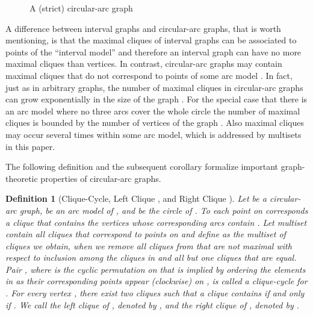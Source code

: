 \documentclass[10pt]{article}
\newtheorem{definition}[theorem]{Definition}
\newcommand{\q}[1]{``#1''}\newcommand{\fu}[1]{\mathcal{#1}}\newcommand{\mc}[1]{\mathsf{#1}}\newcommand{\ri}[1]{\mathscr{#1}}\newcommand{\co}[1]{\fu{C}({#1})}\newcommand{\lc}[1]{\alpha(#1)}\newcommand{\rc}[1]{\beta(#1)}\newcommand{\ema}[1]{\mathcal{#1}}\newcommand{\fe}[2]{\fu{F}(#1,#2)}\newcommand{\lv}[1]{l_{#1}}\newcommand{\rv}[1]{r_{#1}}\newcommand{\mv}[1]{m_{#1}}\newcommand{\lvv}{\lv{v}}
\begin{document}
\begin{figure}[ht]
  \centering
   \vspace{-5pt}\caption{A (strict) circular-arc graph}
  \label{fig:animals}
\end{figure}


A difference between interval graphs and circular-arc graphs, that is worth mentioning, 
is that the maximal cliques of interval graphs can be associated to points of 
the \q{interval model} and therefore an interval graph can have no more maximal cliques 
than vertices. In contrast, circular-arc graphs may contain maximal cliques that do not 
correspond to points of  some arc model \cite{Lin20095618}.
In fact, just as in arbitrary graphs, the number of maximal cliques in circular-arc 
graphs can grow exponentially in the size of the graph \cite{firstCAG}. For
the special case that there is an arc model where no three arcs cover the whole
circle the number of maximal cliques is bounded by the
number of vertices of the graph \cite{CFZ08}. Also maximal cliques may
occur several times within some arc model, which is addressed by multisets in 
this paper.


The following definition and the subsequent corollary formalize important 
graph-theoretic properties of circular-arc graphs.

\begin{definition}[Clique-Cycle, Left Clique , and Right Clique ]\label{lcrc}
Let  be a circular-arc graph,  be an arc model of , and  be the 
circle of .
To each point  on  corresponds a clique that contains the vertices 
whose corresponding arcs contain .
Let multiset  contain all cliques that correspond 
to points on  and define  as the 
multiset of cliques we obtain, when we remove all cliques from  that 
are not maximal with respect to inclusion among the cliques in   and all 
but one cliques that are equal.
Pair , where  is the cyclic permutation on  
that is implied by ordering the elements in  as their corresponding points appear 
(clockwise) on , is called a \emph{clique-cycle} for . 
For every vertex , there
exist two cliques  such that a 
clique  contains  if and 
only if .
We call  the \emph{left clique of }, denoted by , and  
the \emph{right clique of }, denoted by .
\end{definition}
\end{document}
